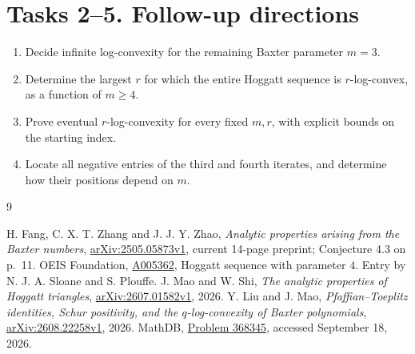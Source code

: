 \documentclass[11pt]{article}
\begin{document}
\section*{Tasks 2--5. Follow-up directions}
\begin{enumerate}[start=2,leftmargin=*]
\item Decide infinite log-convexity for the remaining Baxter
parameter $m=3$.
\item Determine the largest $r$ for which the entire Hoggatt
sequence is $r$-log-convex, as a function of $m\ge4$.
\item Prove eventual $r$-log-convexity for every fixed $m,r$,
with explicit bounds on the starting index.
\item Locate all negative entries of the third and fourth
iterates, and determine how their positions depend on $m$.
\end{enumerate}

\begin{thebibliography}{9}
\raggedright
{} H. Fang, C. X. T. Zhang and J. J. Y. Zhao,
\emph{Analytic properties arising from the Baxter numbers},
\href{https://arxiv.org/abs/2505.05873}{arXiv:2505.05873v1},
current 14-page preprint; Conjecture 4.3 on p.~11.
 OEIS Foundation,
\href{https://oeis.org/A005362}{A005362}, Hoggatt sequence with parameter $4$.
Entry by N. J. A. Sloane and S. Plouffe.
 J. Mao and W. Shi,
\emph{The analytic properties of Hoggatt triangles},
\href{https://arxiv.org/abs/2607.01582}{arXiv:2607.01582v1}, 2026.
 Y. Liu and J. Mao,
\emph{Pfaffian--Toeplitz identities, Schur positivity, and the
$q$-log-convexity of Baxter polynomials},
\href{https://arxiv.org/abs/2608.22258}{arXiv:2608.22258v1}, 2026.
 MathDB, \href{https://mathdb.com/p/368345}{Problem 368345},
accessed September 18, 2026.
\end{thebibliography}
\end{document}
